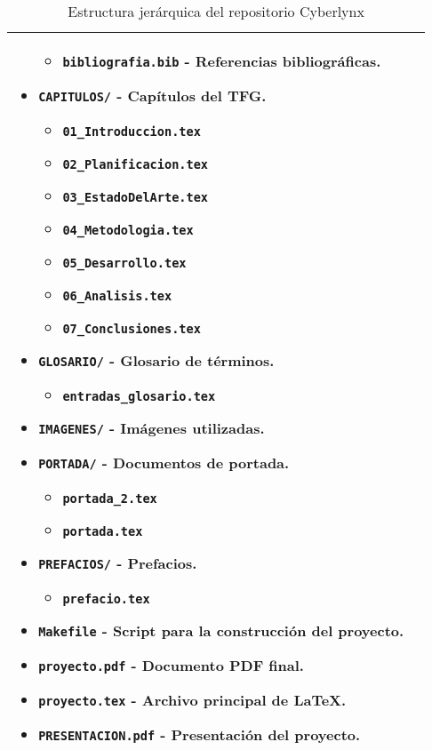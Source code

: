 \begin{table}[H]
\begin{tabularx}{\textwidth}{|>{\raggedright\arraybackslash}p{3cm}|>{\raggedright\arraybackslash}X|}
\begin{itemize}
    \begin{itemize}
        \item \texttt{bibliografia.bib} - Referencias bibliográficas.
    \end{itemize}
    \item \texttt{CAPITULOS/} - Capítulos del TFG.
    \begin{itemize}
        \item \texttt{01\_Introduccion.tex}
        \item \texttt{02\_Planificacion.tex}
        \item \texttt{03\_EstadoDelArte.tex}
        \item \texttt{04\_Metodologia.tex}
        \item \texttt{05\_Desarrollo.tex}
        \item \texttt{06\_Analisis.tex}
        \item \texttt{07\_Conclusiones.tex}
    \end{itemize}
    \item \texttt{GLOSARIO/} - Glosario de términos.
    \begin{itemize}
        \item \texttt{entradas\_glosario.tex}
    \end{itemize}
    \item \texttt{IMAGENES/} - Imágenes utilizadas.
    \item \texttt{PORTADA/} - Documentos de portada.
    \begin{itemize}
        \item \texttt{portada\_2.tex}
        \item \texttt{portada.tex}
    \end{itemize}
    \item \texttt{PREFACIOS/} - Prefacios.
    \begin{itemize}
        \item \texttt{prefacio.tex}
    \end{itemize}
    \item \texttt{Makefile} - Script para la construcción del proyecto.
    \item \texttt{proyecto.pdf} - Documento PDF final. 
    \vspace{2mm}
    \item \texttt{proyecto.tex} - Archivo principal de LaTeX.
    \item \texttt{PRESENTACION.pdf} - Presentación del proyecto.
\end{itemize} \\
\hline
\end{tabularx}
\caption{Estructura jerárquica del repositorio Cyberlynx}
\label{tab:project_structure}
\end{table}

